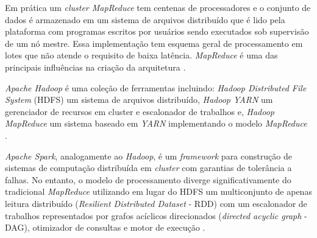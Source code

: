 Em prática um \emph{cluster MapReduce} tem centenas de processadores e o conjunto de dados é
armazenado em um sistema de arquivos distribuído que é lido pela plataforma com
programas escritos por usuários sendo executados sob supervisão de um nó mestre.
Essa implementação tem esquema geral de processamento em lotes que não atende o
requisito de baixa latência.
\emph{MapReduce} é uma das principais influências na criação da arquitetura
\lambdaa \cite{marz2015big}.

\emph{Apache Hadoop} é uma coleção de ferramentas incluindo: \emph{Hadoop
Distributed File System} (HDFS) um sistema de arquivos distribuído, \emph{Hadoop
YARN} um gerenciador de recursos em cluster e escalonador de trabalhos e,
\emph{Hadoop MapReduce} um sistema baseado em \emph{YARN} implementando o modelo
\emph{MapReduce} \cite{ApacheHadoop2020}.





\emph{Apache Spark}, analogamente ao \emph{Hadoop}, é um \emph{framework} para
construção de sistemas de computação distribuída em \emph{cluster} com garantias
de tolerância a falhas. No entanto, o modelo de processamento diverge
significativamente do tradicional \emph{MapReduce} utilizando em lugar do HDFS
um multiconjunto de apenas leitura distribuído (\emph{Resilient Distributed Dataset}
- RDD) com um escalonador de trabalhos representados por grafos acíclicos
direcionados (\emph{directed acyclic graph} - DAG), otimizador de consultas e
motor de execução \cite{ApacheSpark2020}.

